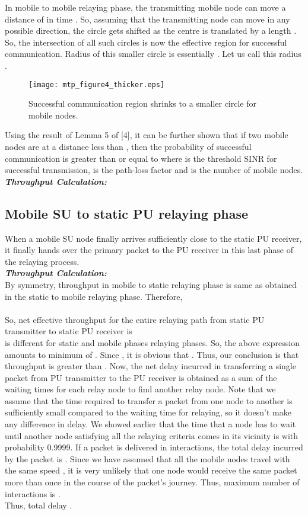 \documentclass[conference]{IEEEtran}
\begin{document}
In mobile to mobile relaying phase, the transmitting mobile node can move a distance of  in time . So, assuming that the transmitting node can move in any possible direction, the 
circle gets shifted as the centre is translated by a length . So, the intersection of all such circles is now the effective region for successful communication. Radius of this smaller 
circle is essentially . Let us call this radius .
\begin{figure}[ht] \centering \label{con} \texttt{[image: mtp\_figure4\_thicker.eps]}\\
\caption{Successful communication region shrinks to a smaller circle for mobile nodes.} 
\vspace{0.05in}
\end{figure}
Using the result of Lemma 5 of [4], it can be further shown that if two mobile nodes are at a distance less than , then the probability 
of successful communication is greater than or equal to  where  is the threshold SINR for successful transmission,  is the path-loss factor and  is the number 
of mobile nodes.\\
\emph{\bf Throughput Calculation:}

\subsection{Mobile SU to static PU relaying phase}
When a mobile SU node finally arrives sufficiently close to the static PU receiver, it finally hands over the primary packet to the PU receiver in this last phase of the relaying process.\\
\emph{\bf Throughput Calculation:}\\
By symmetry, throughput in mobile to static relaying phase is same as obtained in the static to mobile relaying phase. Therefore, 
\\\\
So, net effective throughput for the entire relaying path from static PU transmitter to static PU receiver is \\
 is different for static and mobile phases relaying phases. So, the above expression amounts to minimum of . Since , it is obvious that . Thus, 
our conclusion is that throughput is greater than . Now, the net delay incurred in transferring 
a single packet from PU transmitter to the PU receiver is obtained as a 
sum of the waiting times for each relay node to find another relay node. Note that we assume that the time required to 
transfer a packet from one node to another is sufficiently small compared to the waiting time for relaying, so it 
doesn't make any difference in delay. We showed earlier that the time that a node has to wait until another node 
satisfying all the relaying criteria comes in its vicinity is  with probability 0.9999. If a packet is delivered 
in  interactions, the total delay incurred by the packet is . Since we have assumed that all the mobile nodes travel with the same 
speed , it is very unlikely that one node would receive the same packet more than once in the course of the packet's journey. Thus, maximum number of interactions is .\\
Thus, total delay .
\end{document}
